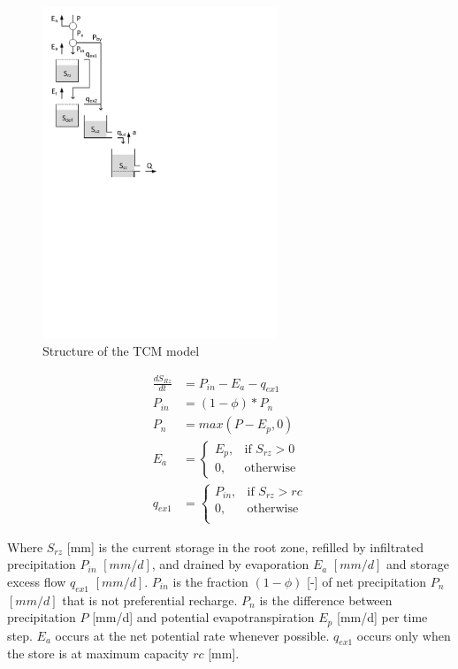 { 																	%
\begin{figure}
\includegraphics[trim=1cm 14.5cm 7cm 1cm,width=7cm,keepaspectratio]{./files/25_schematic.pdf}
\caption{Structure of the TCM model} \label{fig:25_schematic}
\end{figure}

\begin{align}
	\frac{dS_{Rz}}{dt} &= P_{in}-E_a-q_{ex1} \\
	P_{in} &= (1-\phi)*P_n \\
	P_n &= max(P-E_p,0)\\
	E_a &= 
	\begin{cases}
		E_p, & \text{if } S_{rz} > 0 \\
		0, & \text{otherwise}
	\end{cases}\\
	q_{ex1} &= \begin{cases}
		P_{in}, &\text{if } S_{rz} > rc \\
		0, & \text{otherwise} \\
	\end{cases} 
\end{align}

Where $S_{rz}$ [mm] is the current storage in the root zone, refilled by infiltrated precipitation $P_{in}$ $[mm/d]$, and drained by evaporation $E_a$ $[mm/d]$ and storage excess flow $q_{ex1}$ $[mm/d]$. 
$P_{in}$ is the fraction $(1-\phi)$ [-] of net precipitation $P_n$ $[mm/d]$ that is not preferential recharge. 
$P_n$ is the difference between precipitation $P$ [mm/d] and potential evapotranspiration $E_p$ [mm/d] per time step. 
$E_a$ occurs at the net potential rate whenever possible.
$q_{ex1}$ occurs only when the store is at maximum capacity $rc$ [mm].

} %

